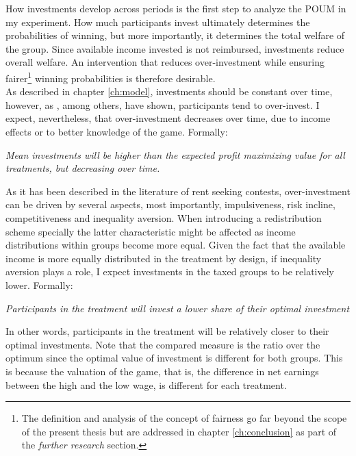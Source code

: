     How investments develop across periods is the first step to analyze the POUM in my experiment. How much participants invest ultimately determines the probabilities of winning, but more importantly, it determines the total welfare of the group. Since available income invested is not reimbursed, investments reduce overall welfare. An intervention that reduces over-investment while ensuring fairer\footnote{The definition and analysis of the concept of fairness go far beyond the scope of the present thesis but are addressed in chapter \ref{ch:conclusion} as part of the \textit{further research} section.} winning probabilities is therefore desirable.\\
    
    As described in chapter \ref{ch:model}, investments should be constant over time, however, as \cite{sheremeta2016}, among others, have shown, participants tend to over-invest. I expect, nevertheless, that over-investment decreases over time, due to income effects or to better knowledge of the game. Formally:\\
    
     \begin{hyp} \label{hyp:treat}\textit{Mean investments will be higher than the expected profit maximizing value for all treatments, but decreasing over time.}\end{hyp}
    
    As it has been described in the literature of rent seeking contests, over-investment can be driven by several aspects, most importantly, impulsiveness, risk incline, competitiveness and inequality aversion. When introducing a redistribution scheme specially the latter characteristic might be affected as income distributions within groups become more equal. Given the fact that the available income is more equally distributed in the treatment by design, if inequality aversion plays a role, I expect investments in the taxed groups to be relatively lower. Formally:\\
    
    \begin{hyp} \label{hyp:treat-overinvest}
    \textit{Participants in the treatment will invest a lower share of their optimal investment}
    \end{hyp}
    
    In other words, participants in the treatment will be relatively closer to their optimal investments. Note that the compared measure is the ratio over the optimum since the optimal value of investment is different for both groups. This is because the valuation of the game, that is, the difference in net earnings between the high and the low wage, is different for each treatment.\\ 
    
